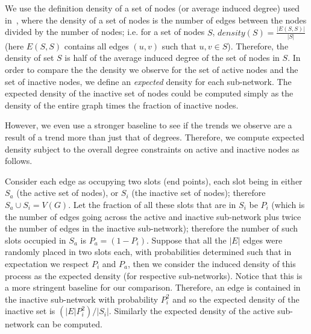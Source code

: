 \documentclass[phd,tocprelim]{cornell}
\begin{document}
We use the definition density of a set of nodes (or average induced degree) used in~\cite{Charikar:2000}, where the density  of a set of nodes is the number of edges between the nodes divided by the number of nodes; i.e. for a set of nodes $S$, $density(S) = \frac{|E(S, S)|}{|S|}$ (here $E(S, S)$ contains all edges $(u, v)$ such that $u, v\in S$). Therefore, the density of set $S$ is half of the average induced degree of the set of nodes in $S$. In order to compare the the density we observe for the set of active nodes and the set of inactive nodes, we define an {\em expected} density for each sub-network. The expected density of the inactive set of nodes could be computed simply as the density of the entire graph times the fraction of inactive nodes. 

However, we even use a stronger baseline to see if the trends we observe are a result of a trend more than just that of degrees. Therefore, we compute expected density subject to the overall degree constraints on active and inactive nodes as follows. 

Consider each edge as occupying two slots (end points), each slot being in either $S_a$ (the active set of nodes), or $S_i$ (the inactive set of nodes); therefore $S_a\cup S_i = V(G)$. Let the fraction of all these slots that are in $S_i$ be $P_i$ (which is the number of edges going across the active and inactive sub-network plus twice the number of edges in the inactive sub-network); therefore the number of such slots occupied in $S_a$ is $P_a = (1-P_i)$. Suppose that all the $|E|$ edges were randomly placed in two slots each, with probabilities determined such that in expectation we respect $P_i$ and $P_a$, then we consider the induced density of this process as the expected density (for respective sub-networks). Notice that this is a more stringent baseline for our comparison. Therefore, an edge is contained in the inactive sub-network with probability $P_i^2$ and so the expected density of the inactive set is $(|E|P_i^2)/|S_i|$. Similarly the expected density of the active sub-network can be computed. 
\end{document}
